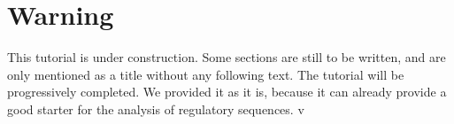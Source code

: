 \section{Warning}

This tutorial is under construction. Some sections are still to be
written, and are only mentioned as a title without any following
text. The tutorial will be progressively completed. We provided it as
it is, because it can already provide a good starter for the analysis
of regulatory sequences.
v